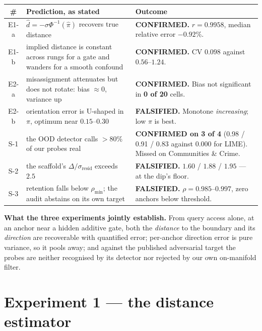 \documentclass[11pt]{article}
\newcommand{\dhat}{\hat{d}}
\newcommand{\pihat}{\hat{\pi}}
\begin{document}
\begin{table}[h]
\small
\begin{tabular}{@{}cp{}p{}@{}}
\toprule
\textbf{\sffamily \#} & \textbf{\sffamily Prediction, as stated} & \textbf{\sffamily Outcome}\\
\midrule
E1-a & $\dhat = -\sigma\Phi^{-1}(\pihat)$ recovers true distance
     & \textbf{CONFIRMED.} $r = 0.9958$, median relative error $-0.92\%$.\\
E1-b & implied distance is constant across rungs for a gate and wanders for a smooth confound
     & \textbf{CONFIRMED.} CV $0.098$ against $0.56$--$1.24$.\\
E2-a & misassignment attenuates but does not rotate: bias $\approx 0$, variance up
     & \textbf{CONFIRMED.} Bias not significant in \textbf{0 of 20} cells.\\
E2-b & orientation error is U-shaped in $\pi$, optimum near $0.15$--$0.30$
     & \textbf{FALSIFIED.} Monotone \emph{increasing}; low $\pi$ is best.\\
S-1 & the OOD detector calls $>80\%$ of our probes real
    & \textbf{CONFIRMED on 3 of 4} (0.98 / 0.91 / 0.83 against 0.000 for LIME).
      Missed on Communities \& Crime.\\
S-2 & the scaffold's $\Delta/\sigma_{\text{resid}}$ exceeds $2.5$
    & \textbf{FALSIFIED.} $1.60$ / $1.88$ / $1.95$ --- at the dip's floor.\\
S-3 & retention falls below $\rho_{\min}$; the audit abstains on its own target
    & \textbf{FALSIFIED.} $\rho = 0.985$--$0.997$, zero anchors below threshold.\\
\bottomrule
\end{tabular}
\end{table}

\begin{claimbox}
\noindent\textbf{What the three experiments jointly establish.} From query access alone, at an
anchor near a hidden additive gate, both the \emph{distance} to the boundary and its
\emph{direction} are recoverable with quantified error; per-anchor direction error is pure
variance, so it pools away; and against the published adversarial target the probes are neither
recognised by its detector nor rejected by our own on-manifold filter.
\end{claimbox}

\part{Experiment 1 --- the distance estimator}
\end{document}
